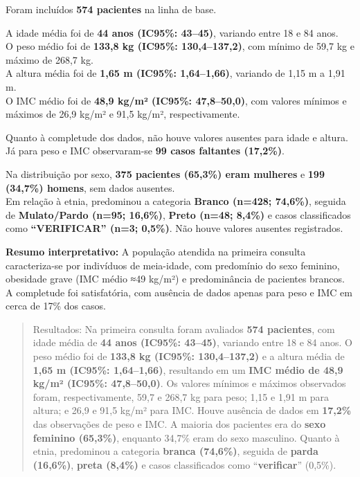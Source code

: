 \documentclass[
]{article}
\begin{document}
Foram incluídos \textbf{574 pacientes} na linha de base.

A idade média foi de \textbf{44 anos (IC95\%: 43--45)}, variando entre
18 e 84 anos.\\
O peso médio foi de \textbf{133,8 kg (IC95\%: 130,4--137,2)}, com mínimo
de 59,7 kg e máximo de 268,7 kg.\\
A altura média foi de \textbf{1,65 m (IC95\%: 1,64--1,66)}, variando de
1,15 m a 1,91 m.\\
O IMC médio foi de \textbf{48,9 kg/m² (IC95\%: 47,8--50,0)}, com valores
mínimos e máximos de 26,9 kg/m² e 91,5 kg/m², respectivamente.

Quanto à completude dos dados, não houve valores ausentes para idade e
altura. Já para peso e IMC observaram-se \textbf{99 casos faltantes
(17,2\%)}.

Na distribuição por sexo, \textbf{375 pacientes (65,3\%) eram mulheres}
e \textbf{199 (34,7\%) homens}, sem dados ausentes.\\
Em relação à etnia, predominou a categoria \textbf{Branco (n=428;
74,6\%)}, seguida de \textbf{Mulato/Pardo (n=95; 16,6\%)}, \textbf{Preto
(n=48; 8,4\%)} e casos classificados como \textbf{``VERIFICAR'' (n=3;
0,5\%)}. Não houve valores ausentes registrados.

\textbf{Resumo interpretativo:} A população atendida na primeira
consulta caracteriza-se por indivíduos de meia-idade, com predomínio do
sexo feminino, obesidade grave (IMC médio ≈49 kg/m²) e predominância de
pacientes brancos. A completude foi satisfatória, com ausência de dados
apenas para peso e IMC em cerca de 17\% dos casos.

\begin{quote}
Resultados: Na primeira consulta foram avaliados \textbf{574 pacientes},
com idade média de \textbf{44 anos (IC95\%: 43--45)}, variando entre 18
e 84 anos. O peso médio foi de \textbf{133,8 kg (IC95\%: 130,4--137,2)}
e a altura média de \textbf{1,65 m (IC95\%: 1,64--1,66)}, resultando em
um \textbf{IMC médio de 48,9 kg/m² (IC95\%: 47,8--50,0)}. Os valores
mínimos e máximos observados foram, respectivamente, 59,7 e 268,7 kg
para peso; 1,15 e 1,91 m para altura; e 26,9 e 91,5 kg/m² para IMC.
Houve ausência de dados em \textbf{17,2\%} das observações de peso e
IMC. A maioria dos pacientes era do \textbf{sexo feminino (65,3\%)},
enquanto 34,7\% eram do sexo masculino. Quanto à etnia, predominou a
categoria \textbf{branca (74,6\%)}, seguida de \textbf{parda (16,6\%)},
\textbf{preta (8,4\%)} e casos classificados como ``\textbf{verificar}''
(0,5\%).
\end{quote}
\end{document}
